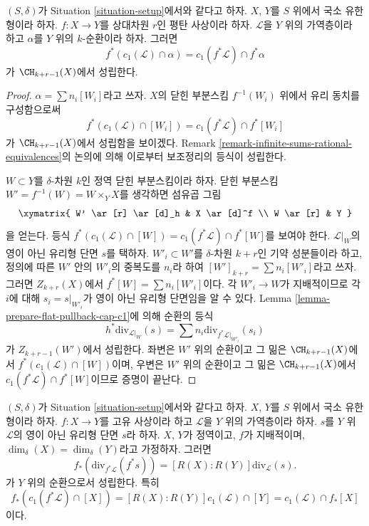 \begin{lemma}
\label{lemma-flat-pullback-cap-c1}
$(S, \delta)$가 Situation \ref{situation-setup}에서와 같다고 하자.
$X$, $Y$를 $S$ 위에서 국소 유한형이라 하자. $f : X \to Y$를 상대차원
$r$인 평탄 사상이라 하자. $\mathcal{L}$을 $Y$ 위의 가역층이라 하고
$\alpha$를 $Y$ 위의 $k$-순환이라 하자. 그러면
$$
f^*(c_1(\mathcal{L}) \cap \alpha) = c_1(f^*\mathcal{L}) \cap f^*\alpha
$$
가 $\CH_{k + r - 1}(X)$에서 성립한다.
\end{lemma}

\begin{proof}
$\alpha = \sum n_i[W_i]$라고 쓰자. $X$의 닫힌 부분스킴
$f^{-1}(W_i)$ 위에서 유리 동치를 구성함으로써
$$
f^*(c_1(\mathcal{L}) \cap [W_i]) = c_1(f^*\mathcal{L}) \cap f^*[W_i]
$$
가 $\CH_{k + r - 1}(X)$에서 성립함을 보이겠다. Remark
\ref{remark-infinite-sums-rational-equivalences}의 논의에 의해 이로부터
보조정리의 등식이 성립한다.

\medskip\noindent
$W \subset Y$를 $\delta$-차원 $k$인 정역 닫힌 부분스킴이라 하자.
닫힌 부분스킴 $W' = f^{-1}(W) = W \times_Y X$를 생각하면 섬유곱 그림
$$
\xymatrix{
W' \ar[r] \ar[d]_h & X \ar[d]^f \\
W \ar[r] & Y
}
$$
을 얻는다. 등식
$f^*(c_1(\mathcal{L}) \cap [W]) = c_1(f^*\mathcal{L}) \cap f^*[W]$를
보여야 한다. $\mathcal{L}|_W$의 영이 아닌 유리형 단면 $s$를 택하자.
$W'_i \subset W'$를 $\delta$-차원 $k + r$인 기약 성분들이라 하고,
정의에 따른 $W'$ 안의 $W'_i$의 중복도를 $n_i$라 하여
$[W']_{k + r} = \sum n_i[W'_i]$라고 쓰자. 그러면
$Z_{k + r}(X)$에서 $f^*[W] = \sum n_i[W'_i]$이다. 각
$W'_i \to W$가 지배적이므로 각 $i$에 대해
$s_i = s|_{W'_i}$가 영이 아닌 유리형 단면임을 알 수 있다. Lemma
\ref{lemma-prepare-flat-pullback-cap-c1}에 의해 순환의 등식
$$
h^*\text{div}_{\mathcal{L}|_W}(s) =
\sum n_i\text{div}_{f^*\mathcal{L}|_{W'_i}}(s_i)
$$
가 $Z_{k + r - 1}(W')$에서 성립한다. 좌변은 $W'$ 위의 순환이고 그
밂은 $\CH_{k + r - 1}(X)$에서
$f^*(c_1(\mathcal{L}) \cap [W])$이며, 우변은 $W'$ 위의 순환이고 그
밂은 $\CH_{k + r - 1}(X)$에서
$c_1(f^*\mathcal{L}) \cap f^*[W]$이므로 증명이 끝난다.
\end{proof}

\begin{lemma}
\label{lemma-equal-c1-as-cycles}
$(S, \delta)$가 Situation \ref{situation-setup}에서와 같다고 하자.
$X$, $Y$를 $S$ 위에서 국소 유한형이라 하자. $f : X \to Y$를 고유
사상이라 하고 $\mathcal{L}$을 $Y$ 위의 가역층이라 하자. $s$를 $Y$ 위
$\mathcal{L}$의 영이 아닌 유리형 단면 $s$라 하자. $X$, $Y$가 정역이고,
$f$가 지배적이며, $\dim_\delta(X) = \dim_\delta(Y)$라고 가정하자. 그러면
$$
f_*\left(\text{div}_{f^*\mathcal{L}}(f^*s)\right) =
[R(X) : R(Y)]\text{div}_\mathcal{L}(s).
$$
가 $Y$ 위의 순환으로서 성립한다. 특히
$$
f_*(c_1(f^*\mathcal{L}) \cap [X]) =
[R(X) : R(Y)] c_1(\mathcal{L}) \cap [Y] =
c_1(\mathcal{L}) \cap f_*[X]
$$
이다.
\end{lemma}


